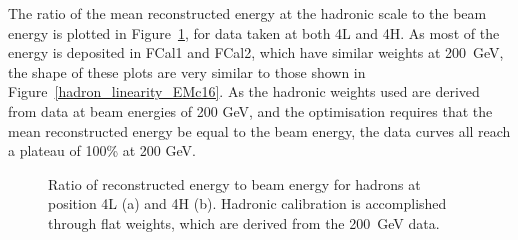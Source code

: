 

The ratio of the mean reconstructed energy at the hadronic scale to the beam energy is plotted in Figure~\ref{TBplot_hadron_linearity}, for data taken at both 4L and 4H. As most of the energy is deposited in FCal1 and FCal2, which have similar weights at 200~GeV, the shape of these plots are very similar to those shown in Figure~\ref{hadron_linearity_EMc16}. As the hadronic weights used are derived from data at beam energies of 200 GeV, and the optimisation requires that the mean reconstructed energy be equal to the beam energy, the data curves all reach a plateau of 100\% at 200 GeV. 


\begin{figure}[!htb]
\begin{center}
\caption[Reconstructed energy vs beam energy, hadrons]{Ratio of reconstructed energy to beam energy for hadrons at position 4L (a) and 4H (b). Hadronic calibration is accomplished through flat weights, which are derived from the 200~GeV data.}
\label{TBplot_hadron_linearity}
\end{center}
\end{figure}







%
%

